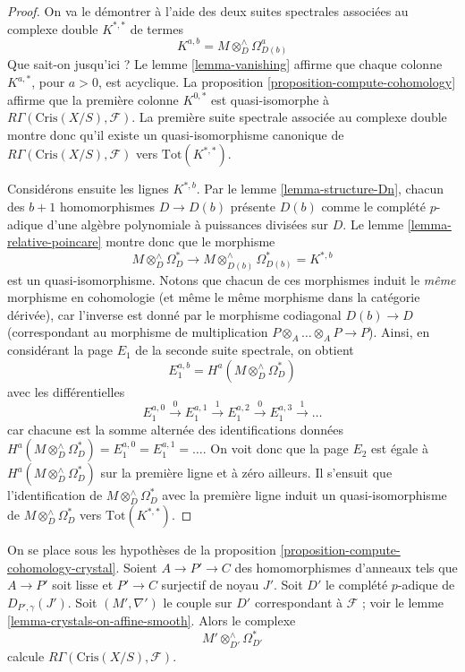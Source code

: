 \begin{proof}
On va le démontrer à l'aide des deux suites spectrales associées au
complexe double $K^{*, *}$ de termes
$$
K^{a, b} = M \otimes_D^\wedge \Omega^a_{D(b)}
$$
Que sait-on jusqu'ici ? Le lemme \ref{lemma-vanishing}
affirme que chaque colonne $K^{a, *}$, pour $a > 0$, est acyclique.
La proposition \ref{proposition-compute-cohomology} affirme que
la première colonne $K^{0, *}$ est quasi-isomorphe à
$R\Gamma(\text{Cris}(X/S), \mathcal{F})$.
La première suite spectrale associée au complexe double
montre donc qu'il existe un quasi-isomorphisme canonique de
$R\Gamma(\text{Cris}(X/S), \mathcal{F})$ vers
$\text{Tot}(K^{*, *})$.

\medskip\noindent
Considérons ensuite les lignes $K^{*, b}$. Par le
lemme \ref{lemma-structure-Dn},
chacun des $b + 1$ homomorphismes $D \to D(b)$ présente $D(b)$ comme le complété $p$-adique
d'une algèbre polynomiale à puissances divisées sur $D$.
Le lemme \ref{lemma-relative-poincare} montre donc que le morphisme
$$
M \otimes^\wedge_D\Omega^*_D
\longrightarrow
M \otimes^\wedge_{D(b)} \Omega^*_{D(b)} = K^{*, b}
$$
est un quasi-isomorphisme. Notons que chacun de ces morphismes induit le {\it même}
morphisme en cohomologie (et même le même morphisme dans la catégorie dérivée), car
l'inverse est donné par le morphisme codiagonal $D(b) \to D$ (correspondant
au morphisme de multiplication $P \otimes_A \ldots \otimes_A P \to P$).
Ainsi, en considérant la page $E_1$ de la seconde suite spectrale,
on obtient
$$
E_1^{a, b} = H^a(M \otimes^\wedge_D\Omega^*_D)
$$
avec les différentielles
$$
E_1^{a, 0} \xrightarrow{0}
E_1^{a, 1} \xrightarrow{1}
E_1^{a, 2} \xrightarrow{0}
E_1^{a, 3} \xrightarrow{1} \ldots
$$
car chacune est la somme alternée des identifications données
$H^a(M \otimes^\wedge_D\Omega^*_D) = E_1^{a, 0} = E_1^{a, 1} = \ldots$.
On voit donc que la page $E_2$ est égale à $H^a(M \otimes^\wedge_D\Omega^*_D)$
sur la première ligne et à zéro ailleurs. Il s'ensuit que l'identification
de $M \otimes^\wedge_D\Omega^*_D$ avec la première ligne induit un
quasi-isomorphisme de $M \otimes^\wedge_D\Omega^*_D$ vers
$\text{Tot}(K^{*, *})$.
\end{proof}

\begin{lemma}
\label{lemma-compute-cohomology-crystal-smooth}
On se place sous les hypothèses de la proposition \ref{proposition-compute-cohomology-crystal}.
Soient $A \to P' \to C$ des homomorphismes d'anneaux tels que $A \to P'$ soit lisse et $P' \to C$
surjectif de noyau $J'$. Soit $D'$ le complété $p$-adique de
$D_{P', \gamma}(J')$. Soit $(M', \nabla')$ le couple sur $D'$
correspondant à $\mathcal{F}$ ; voir le
lemme \ref{lemma-crystals-on-affine-smooth}. Alors le complexe
$$
M' \otimes^\wedge_{D'} \Omega^*_{D'}
$$
calcule $R\Gamma(\text{Cris}(X/S), \mathcal{F})$.
\end{lemma}

